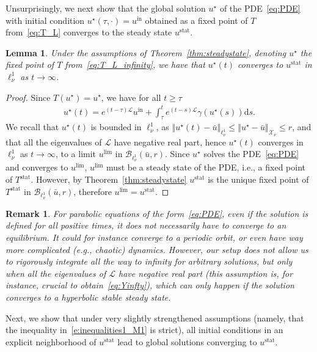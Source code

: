 \documentclass[10pt,a4paper]{article}
\theoremstyle{plain}
\newtheorem{lemma}[theorem]{Lemma}
\newtheorem{remark}[theorem]{Remark}
\newcommand{\B}{\mathcal{B}}
\renewcommand{\B}{\mathcal{B}}
\renewcommand{\L}{\mathcal{L}}
\newcommand{\X}{\mathcal{X}}
\newcommand{\bu}{\bar{u}}
\newcommand{\1}{\mathbf{1}}
\renewcommand{\d}{\mathrm{d}}
\newcommand{\uin}{{u^{\mathrm{in}}}}
\newcommand{\stat}{\mathrm{stat}}
\begin{document}
Unsurprisingly, we next show that the global solution $u^\star$ of the PDE~\eqref{eq:PDE} with initial condition $u^\star(\tau,\cdot) = \uin$ obtained as a fixed point of $T$ from~\eqref{eq:T_L} converges to the steady state $u^\stat$.
%
\begin{lemma}
\label{lem:convergencetosteadystate}
Under the assumptions of Theorem~\ref{thm:steadystate}, denoting $u^\star$ the fixed point of $T$ from~\eqref{eq:T_L_infinity}, we have that $u^\star(t)$ converges to $u^\stat$ in $\ell^1_\nu$ as $t\to\infty$.
\end{lemma}
%
\begin{proof}
Since $T(u^\star) = u^\star$, we have for all $t\geq \tau$
\begin{align*}
u^\star(t) = e^{(t-\tau)\L}\uin + \int_\tau^t e^{(t-s)\L} \gamma(u^\star(s))\d s.
\end{align*}
We recall that $u^\star(t)$ is bounded in $\ell^1_\nu$, as $\left\Vert u^\star(t) - \bu\right\Vert_{\ell^1_\nu} \leq \left\Vert u^\star - \bu\right\Vert_{\X_\nu} \leq r$, and that all the eigenvalues of $\L$ have negative real part, hence $u^\star(t)$ converges in $\ell^1_\nu$ as $t\to\infty$, to a limit $u^{\lim}$ in $\B_{\ell^1_\nu}(\bu,r)$. Since $u^\star$ solves the PDE~\eqref{eq:PDE} and converges to $u^{\lim}$, $u^{\lim}$ must be a steady state of the PDE, i.e., a fixed point of $T^\stat$. However, by Theorem~\ref{thm:steadystate} $u^\stat$ is the unique fixed point of $T^\stat$ in $\B_{\ell^1_\nu}(\bu,r)$, therefore $u^{\lim} = u^\stat$.
\end{proof}
%
\begin{remark}
For parabolic equations of the form~\eqref{eq:PDE}, even if the solution is defined for all positive times, it does not necessarily have to converge to an equilibrium. It could for instance converge to a periodic orbit, or even have way more complicated (e.g., chaotic) dynamics. However, our setup does not allow us to rigorously integrate all the way to infinity for arbitrary solutions, but only when all the eigenvalues of $\L$ have negative real part (this assumption is, for instance, crucial to obtain~\eqref{eq:Yinfty}), which can only happen if the solution converges to a hyperbolic stable steady state. 
\end{remark}
%
Next, we show that under very slightly strengthened assumptions (namely, that the inequality in~\eqref{e:inequalities1_M1} is strict), all initial conditions in an explicit neighborhood of $u^\stat$ lead to global solutions converging to $u^\stat$. 
%
\end{document}

